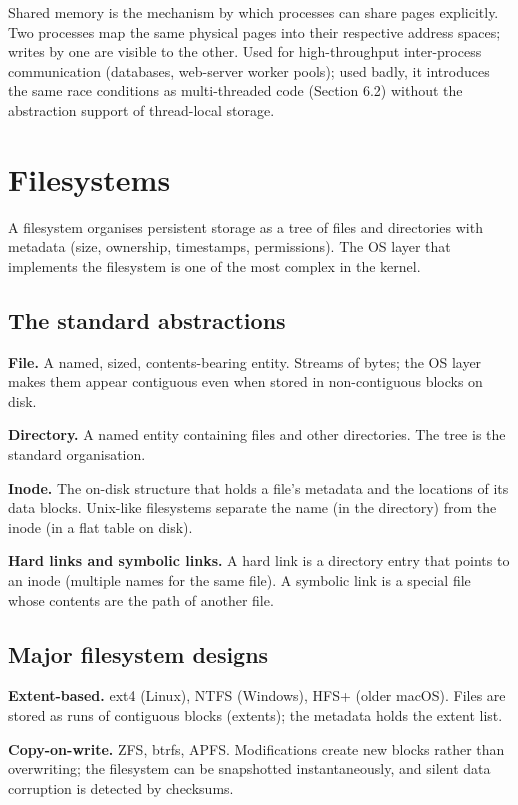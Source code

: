 Shared memory is the mechanism by which processes can share pages explicitly. Two processes map the same physical pages into their respective address spaces; writes by one are visible to the other. Used for high-throughput inter-process communication (databases, web-server worker pools); used badly, it introduces the same race conditions as multi-threaded code (Section 6.2) without the abstraction support of thread-local storage.

\section{Filesystems}

A filesystem organises persistent storage as a tree of files and directories with metadata (size, ownership, timestamps, permissions). The OS layer that implements the filesystem is one of the most complex in the kernel.

\subsection{The standard abstractions}

\textbf{File.} A named, sized, contents-bearing entity. Streams of bytes; the OS layer makes them appear contiguous even when stored in non-contiguous blocks on disk.

\textbf{Directory.} A named entity containing files and other directories. The tree is the standard organisation.

\textbf{Inode.} The on-disk structure that holds a file's metadata and the locations of its data blocks. Unix-like filesystems separate the name (in the directory) from the inode (in a flat table on disk).

\textbf{Hard links and symbolic links.} A hard link is a directory entry that points to an inode (multiple names for the same file). A symbolic link is a special file whose contents are the path of another file.

\subsection{Major filesystem designs}

\textbf{Extent-based.} ext4 (Linux), NTFS (Windows), HFS+ (older macOS). Files are stored as runs of contiguous blocks (extents); the metadata holds the extent list.

\textbf{Copy-on-write.} ZFS, btrfs, APFS. Modifications create new blocks rather than overwriting; the filesystem can be snapshotted instantaneously, and silent data corruption is detected by checksums.

